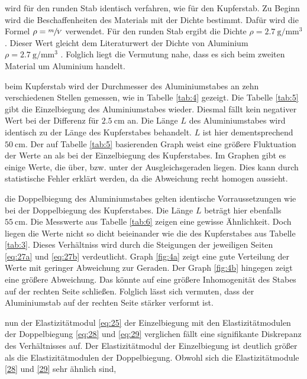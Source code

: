 
\justifying wird für den runden Stab identisch verfahren, wie für den Kupferstab. Zu Beginn wird die Beschaffenheiten des Materials
mit der Dichte bestimmt. Dafür wird die Formel $\rho = \sfrac{m}{V}$ verwendet. Für den runden Stab ergibt die Dichte $\rho = \SI{2.7}{\gram\per\milli\meter\tothe{3}}$.
Dieser Wert gleicht dem Literaturwert der Dichte von Aluminium $\rho = \SI{2.7}{\gram\per\milli\meter\tothe{3}}$ \cite{Aluminiumdichte}. Folglich liegt
die Vermutung nahe, dass es sich beim zweiten Material um Aluminium handelt. 

\justifying beim Kupferstab wird der Durchmesser des Aluminiumstabes an zehn verschiedenen Stellen gemessen, wie in Tabelle \ref{tab:4}
gezeigt. Die Tabelle \ref{tab:5} gibt die Einzelbiegung des Aluminiumstabes wieder. Diesmal fällt kein negativer Wert bei der Differenz für 
$\SI{2.5}{\centi\meter}$ an. Die Länge $L$ des Aluminiumstabes wird identisch zu der Länge des Kupferstabes behandelt. $L$ ist hier dementsprechend
$\SI{50}{\centi\meter}$. Der auf Tabelle \ref{tab:5} basierenden Graph weist eine größere Fluktuation der Werte an als bei der Einzelbiegung 
des Kupferstabes. Im Graphen gibt es einige Werte, die über, bzw. unter der Ausgleichsgeraden liegen. Dies kann durch statistische Fehler erklärt werden,
da die Abweichung recht homogen aussieht.

\justifying die Doppelbiegung des Aluminiumstabes gelten identische Vorraussetzungen wie bei der Doppelbiegung des Kupferstabes.
Die Länge $L$ beträgt hier ebenfalls $\SI{55}{\centi\meter}$. Die Messwerte aus Tabelle \ref{tab:6} zeigen eine gewisse Ähnlichkeit. Doch liegen 
die Werte nicht so dicht beieinander wie die des Kupferstabes aus Tabelle \ref{tab:3}. Dieses Verhältniss wird durch die Steigungen der jeweiligen
Seiten \eqref{eq:27a} und \eqref{eq:27b} verdeutlicht. Graph \ref{fig:4a} zeigt eine gute Verteilung der Werte mit geringer Abweichung zur Geraden.
Der Graph \ref{fig:4b} hingegen zeigt eine größere Abweichung. Das könnte auf eine größere Inhomogenität des Stabes auf der rechten Seite schließen. 
Folglich lässt sich vermuten, dass der Aluminiumstab auf der rechten Seite stärker verformt ist. 

\justifying nun der Elastizitätmodul \eqref{eq:25} der Einzelbiegung mit den Elastizitätmodulen der Doppelbiegung \eqref{eq:28}
und \eqref{eq:29} verglichen fällt eine signifikante Diskrepanz des Verhältnisses auf. Der Elastizitätmodul der Einzelbiegung ist deutlich größer
als die Elastizitätmodulen der Doppelbiegung. Obwohl sich die Elastizitätmodule \eqref{28} und \eqref{29} sehr ähnlich sind, 

\newpage

\printbibliography
